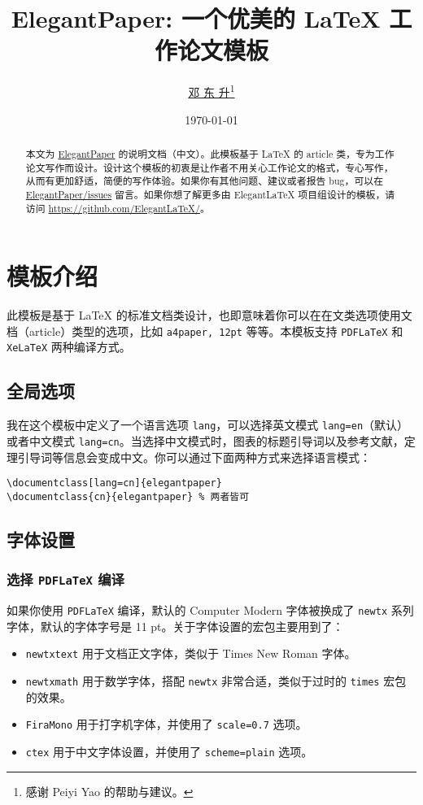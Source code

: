 \documentclass[lang=cn]{elegantpaper}
\title{ElegantPaper: 一个优美的 \LaTeX{} 工作论文模板}
\author{\href{https://ddswhu.me/}{邓 东 升}\thanks{感谢 Peiyi Yao 的帮助与建议。}}
\institute{\href{https://elegantlatex.org/}{Elegant\LaTeX{} 项目组}}
\date{\today}
\begin{document}
\maketitle

\begin{abstract}
\noindent 本文为 \href{https://github.com/ElegantLaTeX/ElegantPaper/}{ElegantPaper} 的说明文档（中文）。此模板基于 \LaTeX{} 的 article 类，专为工作论文写作而设计。设计这个模板的初衷是让作者不用关心工作论文的格式，专心写作，从而有更加舒适，简便的写作体验。如果你有其他问题、建议或者报告 bug，可以在 \href{https://github.com/ElegantLaTeX/ElegantPaper/issues}{ElegantPaper/issues} 留言。如果你想了解更多由 Elegant\LaTeX{} 项目组设计的模板，请访问 \href{https://github.com/ElegantLaTeX/}{https://github.com/ElegantLaTeX/}。
\end{abstract}

\section{模板介绍}

此模板是基于 \LaTeX{} 的标准文档类设计，也即意味着你可以在在文类选项使用文档（article）类型的选项，比如 \lstinline{a4paper, 12pt} 等等。本模板支持 \lstinline{PDFLaTeX} 和 \lstinline{XeLaTeX} 两种编译方式。
      
\subsection{全局选项}
我在这个模板中定义了一个语言选项 \lstinline{lang}，可以选择英文模式 \lstinline{lang=en}（默认）或者中文模式 \lstinline{lang=cn}。当选择中文模式时，图表的标题引导词以及参考文献，定理引导词等信息会变成中文。你可以通过下面两种方式来选择语言模式：
\begin{lstlisting}
\documentclass[lang=cn]{elegantpaper}
\documentclass{cn}{elegantpaper} % 两者皆可
\end{lstlisting}

\subsection{字体设置}
\subsubsection[选择 PDFLaTeX 编译]{选择 \lstinline{PDFLaTeX} 编译}
如果你使用 \lstinline{PDFLaTeX} 编译，默认的 Computer Modern 字体被换成了 \lstinline{newtx} 系列字体，默认的字体字号是 11 pt。关于字体设置的宏包主要用到了：
\begin{itemize}
	\item \lstinline{newtxtext} 用于文档正文字体，类似于 Times New Roman 字体。
	\item \lstinline{newtxmath} 用于数学字体，搭配 \lstinline{newtx} 非常合适，类似于过时的 \lstinline{times} 宏包的效果。
	\item \lstinline{FiraMono} 用于打字机字体，并使用了 \lstinline{scale=0.7} 选项。
	\item \lstinline{ctex} 用于中文字体设置，并使用了 \lstinline{scheme=plain} 选项。
\end{itemize}
\end{document}
